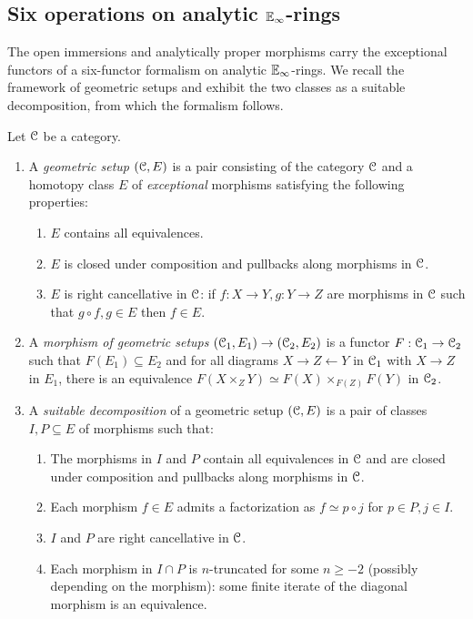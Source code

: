 \subsection{Six operations on analytic \texorpdfstring{$\mathbb{E}_{\infty}$}{E-infinity}-rings}\label{subsec: six operations on analytic rings}
The open immersions and analytically proper morphisms carry the exceptional functors of a six-functor formalism on analytic $\mathbb{E}_{\infty}$-rings. We recall the framework of geometric setups \cite[\S 2]{HeyerMann6FF} and exhibit the two classes as a suitable decomposition, from which the formalism follows.
\begin{definition}\label{def: geometric setup and suitable decomposition}
    Let $\EuScript{C}$ be a category. 
    \begin{enumerate}
        \item A \emph{geometric setup} $(\EuScript{C},E)$ is a pair consisting of the category $\EuScript{C}$ and a homotopy class $E$ of \emph{exceptional} morphisms satisfying the following properties:
        \begin{enumerate}[label=(\roman*)]
            \item $E$ contains all equivalences. 
            \item $E$ is closed under composition and pullbacks along morphisms in $\EuScript{C}$. 
            \item $E$ is right cancellative in $\EuScript{C}$: if $f:X\to Y, g:Y\to Z$ are morphisms in $\EuScript{C}$ such that $g\circ f, g\in E$ then $f\in E$. 
        \end{enumerate} 
        \item A \emph{morphism of geometric setups} $(\EuScript{C}_{1},E_{1})\to(\EuScript{C}_{2},E_{2})$ is a functor $F:\EuScript{C}_{1}\to\EuScript{C}_{2}$ such that $F(E_{1})\subseteq E_{2}$ and for all diagrams $X\to Z\leftarrow Y$ in $\EuScript{C}_{1}$ with $X\to Z$ in $E_{1}$, there is an equivalence $F(X\times_{Z}Y)\simeq F(X)\times_{F(Z)}F(Y)$ in $\EuScript{C}_{2}$. 
        \item A \emph{suitable decomposition} of a geometric setup $(\EuScript{C},E)$ is a pair of classes $I,P\subseteq E$ of morphisms such that:
        \begin{enumerate}[label=(\roman*)]
            \item The morphisms in $I$ and $P$ contain all equivalences in $\EuScript{C}$ and are closed under composition and pullbacks along morphisms in $\EuScript{C}$. 
            \item Each morphism $f\in E$ admits a factorization as $f\simeq p\circ j$ for $p\in P, j\in I$. 
            \item $I$ and $P$ are right cancellative in $\EuScript{C}$. 
            \item Each morphism in $I\cap P$ is $n$-truncated for some $n\geq-2$ (possibly depending on the morphism): some finite iterate of the diagonal morphism is an equivalence. 
        \end{enumerate}
    \end{enumerate}
\end{definition}
